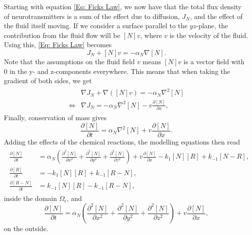 \documentclass{article}
\begin{document}
Starting with equation \eqref{Eq: Ficks Law}, we now have that the total flux density of neurotransmitters is a sum of the effect due to diffusion, $J_N$, and the effect of the fluid itself moving. If we consider a surface parallel to the $yz$-plane, the contribution from the fluid flow will be $[N] v$, where $v$ is the velocity of the fluid. Using this, \eqref{Eq: Ficks Law} becomes
\begin{equation}
    J_N + [N]v = -\alpha_N \nabla [N].
\end{equation}
Note that the assumptions on the fluid field $v$ means $[N]v$ is a vector field with 0 in the y- and z-components everywhere. This means that when taking the gradient of both sides, we get
\begin{align}
\begin{split}
    & \nabla J_N + \nabla ([N]v) = -\alpha_N \nabla^2 [N]\\
    \Longleftrightarrow & \nabla J_N = -\alpha_N \nabla^2 [N] - v\frac{\partial [N]}{\partial x},
\end{split}
\end{align}
Finally, conservation of mass gives 
\begin{equation}
    \frac{\partial [N]}{\partial t} = \alpha_N \nabla^2 [N] + v\frac{\partial [N]}{\partial x}.
\end{equation}
Adding the effects of the chemical reactions, the modelling equations then read
\begin{align}
\begin{split}
     \frac{\partial [N]}{\partial t} &= \alpha_N \left( \frac{\partial^2 [N]}{\partial x^2} + \frac{\partial^2 [N]}{\partial y^2} + \frac{\partial^2 [N]}{\partial z^2} \right) + v\frac{\partial [N]}{\partial x} -  k_1 [N] [R] +  k_{-1} [N-R],\\
     \frac{\partial [R]}{\partial t} &= - k_1[N][R] + k_{-1}[R-N],\\
    \frac{\partial [R-N]}{\partial t} &= k_{-1}[N][R] - k_{-1}[R-N],
\end{split}
\end{align}
inside the domain $\Omega_\epsilon$, and 
\begin{equation}
    \frac{\partial [N]}{\partial t} = \alpha_N \left( \frac{\partial^2 [N]}{\partial x^2} + \frac{\partial^2 [N]}{\partial y^2} + \frac{\partial^2 [N]}{\partial z^2} \right) + v\frac{\partial [N]}{\partial x},
\end{equation}
on the outside.
\end{document}
